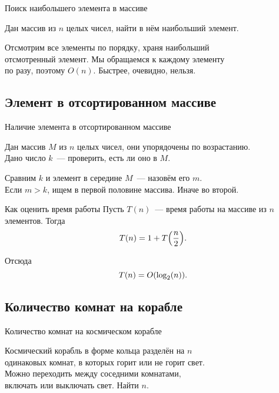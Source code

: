\begin{frame}{Поиск наибольшего элемента в массиве} \ \\
\begin{task}
	Дан массив из \(n\) целых чисел, найти в нём наибольший элемент.
\end{task}

Отсмотрим все элементы по порядку, храня наибольший \\
отсмотренный элемент. Мы обращаемся к каждому элементу \\
по разу, поэтому \(O(n)\). Быстрее, очевидно, нельзя.
	
\end{frame}

\subsection{Элемент в отсортированном массиве}

\begin{frame}{Наличие элемента в отсортированном массиве} \ \\
\begin{task}
	Дан массив \(M\) из \(n\) целых чисел, они упорядочены по возрастанию. \\
	Дано число \(k\)~— проверить, есть ли оно в \(M\).
\end{task}

Сравним \(k\) и элемент в середине \(M\)~— назовём его \(m\). \\
Если \(m>k\), ищем в первой половине массива. Иначе во второй.
	
\end{frame}

\begin{frame}{Как оценить время работы}
	Пусть \(T(n)\)~— время работы на массиве из \(n\) элементов. Тогда
	\[ T(n) = 1 + T\lr*{\frac{n}{2}}.\]

	Отсюда \[ T(n) = O\lr*{\log_2 \lr*{n}}.\]
\end{frame}

\subsection{Количество комнат на корабле}

\begin{frame}{Количество комнат на космическом корабле} \ \\
\begin{task}
	Космический корабль в форме кольца разделён на \(n\) \\
	одинаковых комнат, в которых горит или не горит свет. \\
	Можно переходить между соседними комнатами, \\
	включать или выключать свет. Найти \(n\).
\end{task} \medskip

\begin{center}  \end{center}
\end{frame}


